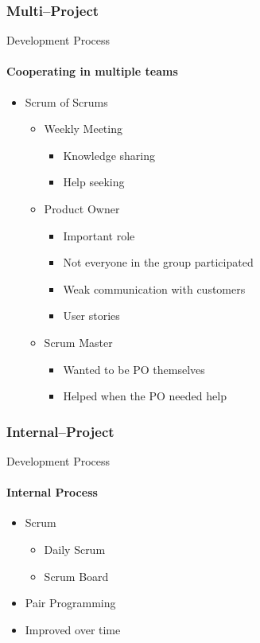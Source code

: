 	\subsubsection{Multi--Project}
    \begin{frame}[t]{Development Process}\framesubtitle{Cooperating in multiple teams}
    \begin{itemize}
        \item Scrum of Scrums
        	\begin{itemize}
        		\item Weekly Meeting
    			\begin{itemize}
        			\item Knowledge sharing 
        			\item Help seeking
        		\end{itemize}
        		\item Product Owner        			
    			\begin{itemize}
        			\item Important role
        			\item Not everyone in the group participated
        			\item Weak communication with customers
        			\item User stories
        		\end{itemize}
        		\item Scrum Master
        		\begin{itemize}
        			\item Wanted to be PO themselves
        			\item Helped when the PO needed help
        		\end{itemize}
    		\end{itemize}
    \end{itemize}
	\end{frame}
	 \subsubsection{Internal--Project}
	\begin{frame}[t]{Development Process}\framesubtitle{Internal Process}
    \begin{itemize}
        \item Scrum
        \begin{itemize}
        	\item Daily Scrum
        	\item Scrum Board
        \end{itemize}
        \item Pair Programming
        \bigskip
        \item Improved over time
    \end{itemize}
	\end{frame}
